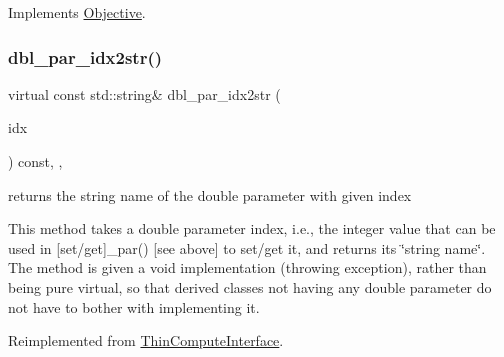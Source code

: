 Implements \mbox{\hyperlink{class_s_m_spp__di__unipi__it_1_1_objective_a504d4e3e174c7a518cc66156a8a45ce5}{Objective}}.

\mbox{\label{class_s_m_spp__di__unipi__it_1_1_f_real_objective_a93f1297e7910e91cc18b303376191026}} 
\subsubsection{\texorpdfstring{dbl\+\_\+par\+\_\+idx2str()}{dbl\_par\_idx2str()}}
{\footnotesize\ttfamily virtual const std\+::string\& dbl\+\_\+par\+\_\+idx2str (\begin{DoxyParamCaption}\item[{const \mbox{\hyperlink{class_s_m_spp__di__unipi__it_1_1_thin_compute_interface_aa3d710629ad8c434286726ad810c3b47}{idx\+\_\+type}}}]{idx }\end{DoxyParamCaption}) const\hspace{0.3cm}{\ttfamily [inline]}, {\ttfamily [override]}, {\ttfamily [virtual]}}



returns the string name of the double parameter with given index 

This method takes a double parameter index, i.\+e., the integer value that can be used in \mbox{[}set/get\mbox{]}\+\_\+par() \mbox{[}see above\mbox{]} to set/get it, and returns its \char`\"{}string name\char`\"{}. The method is given a void implementation (throwing exception), rather than being pure virtual, so that derived classes not having any double parameter do not have to bother with implementing it. 

Reimplemented from \mbox{\hyperlink{class_s_m_spp__di__unipi__it_1_1_thin_compute_interface_a1be0e4ca13f9253674bc4fa7b67fe40e}{Thin\+Compute\+Interface}}.

\mbox{\label{class_s_m_spp__di__unipi__it_1_1_f_real_objective_a6d353ac3d1200d9bea89235da61bc4f3}} 
